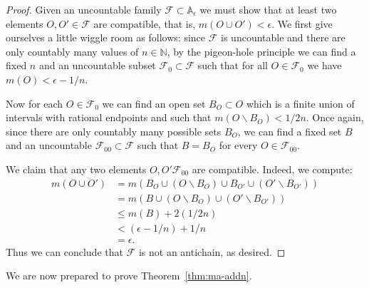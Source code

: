 \documentclass[11pt,oneside]{amsbook}
\newcommand{\NN}{\mathbb N}
\theoremstyle{definition}
\theoremstyle{plain}
\theoremstyle{definition}
\theoremstyle{remark}
\numberwithin{equation}{section}
\numberwithin{figure}{section}
\begin{document}
\begin{proof}
  Given an uncountable family $\mathcal F\subset\mathbb A_\epsilon$ we must show that at least two elements $O,O'\in\mathcal F$ are compatible, that is, $m(O\cup O')<\epsilon$. We first give ourselves a little wiggle room as follows: since $\mathcal F$ is uncountable and there are only countably many values of $n\in\NN$, by the pigeon-hole principle we can find a fixed $n$ and an uncountable subset $\mathcal F_0\subset\mathcal F$ such that for all $O\in\mathcal F_0$ we have $m(O)<\epsilon-1/n$.

  Now for each $O\in\mathcal F_0$ we can find an open set $B_O\subset O$ which is a finite union of intervals with rational endpoints and such that $m(O\smallsetminus B_O)<1/2n$. Once again, since there are only countably many possible sets $B_O$, we can find a fixed set $B$ and an uncountable $\mathcal F_{00}\subset\mathcal F$ such that $B=B_O$ for every $O\in\mathcal F_{00}$.

  We claim that any two elements $O,O'\mathcal F_{00}$ are compatible. Indeed, we compute:
  \begin{align*}
    m(O\cup O')&=m(B_O\cup(O\smallsetminus B_O)\cup B_{O'}\cup(O'\smallsetminus B_{O'}))\\
    &=m(B\cup(O\smallsetminus B_O)\cup(O'\smallsetminus B_{O'}))\\
    &\leq m(B)+2(1/2n)\\
    &<(\epsilon-1/n)+1/n\\
    &=\epsilon\text{.}
  \end{align*}
  Thus we can conclude that $\mathcal F$ is not an antichain, as desired.
\end{proof}

We are now prepared to prove Theorem~\ref{thm:ma-addn}.
\end{document}
